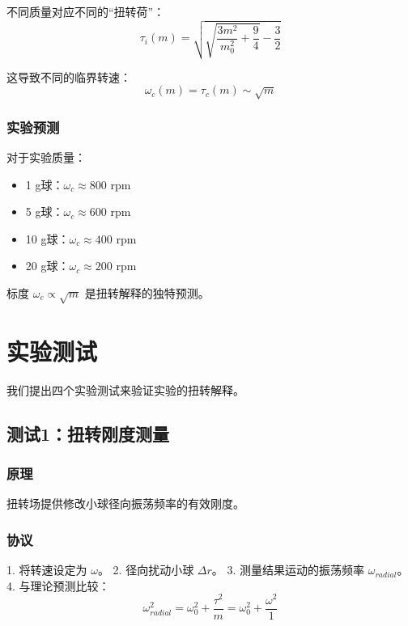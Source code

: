\documentclass[12pt,a4paper]{article}
\begin{document}
不同质量对应不同的``扭转荷''：
\begin{equation}
    \tau_i(m) = \sqrt{\sqrt{\frac{3m^2}{m_0^2} + \frac{9}{4}} - \frac{3}{2}}
\end{equation}

这导致不同的临界转速：
\begin{equation}
    \omega_c(m) = \tau_c(m) \sim \sqrt{m}
\end{equation}

\subsubsection{实验预测}

对于实验质量：
\begin{itemize}
    \item 1 g球：$\omega_c \approx 800$ rpm
    \item 5 g球：$\omega_c \approx 600$ rpm  
    \item 10 g球：$\omega_c \approx 400$ rpm
    \item 20 g球：$\omega_c \approx 200$ rpm
\end{itemize}

标度 $\omega_c \propto \sqrt{m}$ 是扭转解释的独特预测。

\section{实验测试}
\label{sec:tests}

我们提出四个实验测试来验证实验的扭转解释。

\subsection{测试1：扭转刚度测量}

\subsubsection{原理}

扭转场提供修改小球径向振荡频率的有效刚度。

\subsubsection{协议}

1. 将转速设定为 $\omega$。
2. 径向扰动小球 $\Delta r$。
3. 测量结果运动的振荡频率 $\omega_{radial}$。
4. 与理论预测比较：
\begin{equation}
    \omega_{radial}^2 = \omega_0^2 + \frac{\tau^2}{m} = \omega_0^2 + \frac{\omega^2}{1}
\end{equation}
\end{document}
